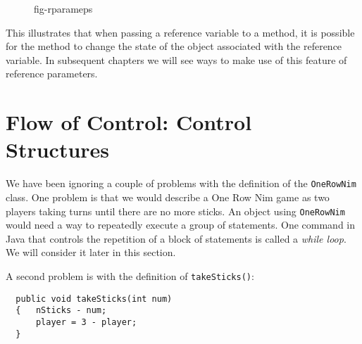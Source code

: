 \begin{figure}[tb]
{fig-rparameps}
\end{figure}

\noindent This illustrates that when passing a reference variable
to a method, it is possible for the method to change the state of the
object associated with the reference variable.  In subsequent chapters
we will see ways to make use of this feature of reference parameters.



\section{Flow of Control: Control Structures}
\label{flowof-control-control-structures}

\noindent We have been ignoring a couple of problems with the
definition of the {\tt OneRowNim} class.  One problem is that we would
describe a One Row Nim game as two players taking turns until there
are no more sticks. An object using {\tt OneRowNim} would need a way
to repeatedly execute a group of statements. One command in Java that
controls the repetition of a block of statements is called a {\it
while loop}.  We will consider it later in this section.

A second problem is with the definition of {\tt takeSticks()}:

\begin{jjjlisting}
\begin{lstlisting}
  public void takeSticks(int num)
  {   nSticks - num;
      player = 3 - player;
  }
\end{lstlisting}
\end{jjjlisting}


